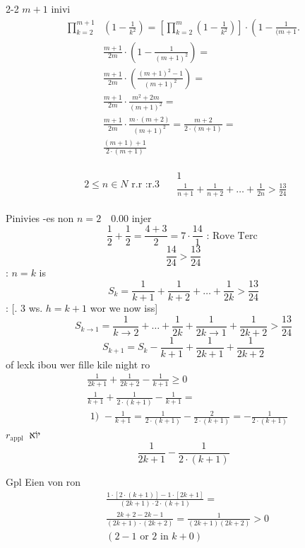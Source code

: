 \documentclass[12pt]{article}
\begin{document}
2-2
\(m+1\) inivi
\[
\begin{aligned}
\prod_{k=2}^{m+1} & \left(1-\frac{1}{k^{2}}\right)=\left[\prod_{k=2}^{m}\left(1-\frac{1}{k^{2}}\right)\right] \cdot\left(1-\frac{1}{(m+1} .\right. \\
& \frac{m+1}{2 m} \cdot\left(1-\frac{1}{(m+1)^{2}}\right)= \\
& \frac{m+1}{2 m} \cdot\left(\frac{(m+1)^{2}-1}{(m+1)^{2}}\right)= \\
& \frac{m+1}{2 m} \cdot \frac{m^{2}+2 m}{(m+1)^{2}}= \\
& \frac{m+1}{2 m} \cdot \frac{m \cdot(m+2)}{(m+1)^{2}}=\frac{m+2}{2 \cdot(m+1)}= \\
& \frac{(m+1)+1}{2 \cdot(m+1)}
\end{aligned}
\]

\[
\begin{aligned}
& 2 \leq n \in N \text { r.r :r.3 } \quad \begin{array}{r}
1 \\
\frac{1}{n+1}+\frac{1}{n+2}+\ldots+\frac{1}{2 n}>\frac{13}{24}
\end{array}
\end{aligned}
\]

Pinivies -es non \(n=2 \quad 0.00\) injer
\[
\frac{1}{2}+\frac{1}{2}=\frac{4+3}{2}=7 \cdot \frac{14}{1} \text { : Rove Terc }
\]
\[
\frac{14}{24}>\frac{13}{24}
\]
:
\(n=k\) is
\[
S_{k}=\frac{1}{k+1}+\frac{1}{k+2}+\ldots+\frac{1}{2 k}>\frac{13}{24}
\]
: [. 3 ws. \(h=k+1\) wor we now iss]
\[
S_{k \rightarrow 1}=\frac{1}{k \rightarrow 2}+\ldots+\frac{1}{2 k}+\frac{1}{2 k \rightarrow 1}+\frac{1}{2 k+2}>\frac{13}{24}
\]
\[
S_{k+1}=S_{k}-\frac{1}{k+1}+\frac{1}{2 k+1}+\frac{1}{2 k+2}
\]
of lexk ibou wer fille kile night ro
\[
\begin{aligned}
& \frac{1}{2 k+1}+\frac{1}{2 k+2}-\frac{1}{k+1} \geq 0 \\
& \frac{1}{k+1}+\frac{1}{2 \cdot(k+1)}-\frac{1}{k+1}= \\
& \text { 1) }-\frac{1}{k+1}=\frac{1}{2 \cdot(k+1)}-\frac{2}{2 \cdot(k+1)}=-\frac{1}{2 \cdot(k+1)}
\end{aligned}
\]
\(r_{\text {appl }}\) יוֹא
\[
\frac{1}{2 k+1}-\frac{1}{2 \cdot(k+1)}
\]

Gpl Eien von ron
\[
\begin{aligned}
& \frac{1 \cdot[2 \cdot(k+1)]-1 \cdot[2 k+1]}{(2 k+1) \cdot 2 \cdot(k+1)}= \\
& \frac{2 k+2-2 k-1}{(2 k+1) \cdot(2 k+2)}=\frac{1}{(2 k+1)(2 k+2)}>0 \\
& (2-1 \text { or } 2 \text { in } k+0)
\end{aligned}
\]
\end{document}

